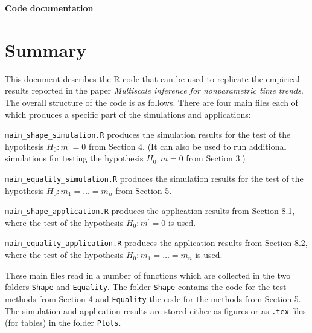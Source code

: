 \documentclass[a4paper,12pt]{article}
\begin{document}
\begin{center}
{\LARGE \bf Code documentation}
\end{center}
\vspace{0.5cm}



\section*{Summary}


\setlength{\parskip}{0.2cm} 
This document describes the R code that can be used to replicate the empirical results reported in the paper \textit{Multiscale inference for nonparametric time trends}. The overall structure of the code is as follows. There are four main files each of which produces a specific part of the simulations and applications:
\vspace{0.2cm}

\everypar{\hangafter=1\hangindent=1.45cm\relax}
\verb|main_shape_simulation.R| \hspace{1pt} produces the simulation results for the test of the hypothesis $H_0: m^\prime = 0$ from Section 4. (It can also be used to run additional simulations for testing the hypothesis $H_0: m = 0$ from Section $3$.)

\verb|main_equality_simulation.R| \hspace{1pt} produces the simulation results for the test of the hypothesis $H_0: m_1 = \ldots = m_n$ from Section 5.

\verb|main_shape_application.R| \hspace{1pt} produces the application results from Section 8.1, where the test of the hypothesis $H_0: m^\prime = 0$ is used.

\verb|main_equality_application.R| \hspace{1pt} produces the application results from Section 8.2, where the test of the hypothesis $H_0: m_1 = \ldots = m_n$ is used. 
\vspace{0.2cm}

\everypar{\hangafter=0\relax}
These main files read in a number of functions which are collected in the two folders \verb|Shape| and \verb|Equality|. The folder \verb|Shape| contains the code for the test methods from Section 4 and \verb|Equality| the code for the methods from Section 5. The simulation and application results are stored either as figures or as \verb|.tex| files (for tables) in the folder \verb|Plots|. 
\vspace{0.2cm}
\end{document}
